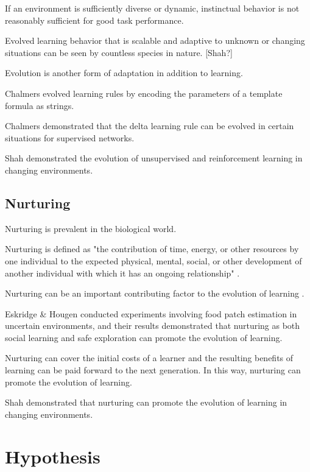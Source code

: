 \documentclass[master]{outhesis}
\begin{document}
If an environment is sufficiently diverse or dynamic, instinctual behavior is not reasonably sufficient for good task performance.

Evolved learning behavior that is scalable and adaptive to unknown or changing situations can be seen by countless species in nature. [Shah?]

Evolution is another form of adaptation in addition to learning.

Chalmers \cite{chalmers-evolution-learning} evolved learning rules by encoding the parameters of a template formula as strings.

Chalmers \cite{chalmers-evolution-learning} demonstrated that the delta learning rule can be evolved in certain situations for supervised networks.

Shah \cite{Shah:2015hs} demonstrated the evolution of unsupervised and reinforcement learning in changing environments.

\section{Nurturing}

Nurturing is prevalent in the biological world.

Nurturing is defined as "the contribution of time, energy, or other resources by one individual to the expected physical, mental, social, or other development of another individual with which it has an ongoing relationship" \cite{nurturing-definition}.

Nurturing can be an important contributing factor to the evolution of learning \cite{nurturing-definition} \cite{eskridge-learning-uncertain-environments}. 

Eskridge \& Hougen \cite{eskridge-learning-uncertain-environments} conducted experiments involving food patch estimation in uncertain environments, and their results demonstrated that nurturing as both social learning and safe exploration can promote the evolution of learning. 

Nurturing can cover the initial costs of a learner and the resulting benefits of learning can be paid forward to the next generation. In this way, nurturing can promote the evolution of learning.

Shah \cite{Shah:2015hs} demonstrated that nurturing can promote the evolution of learning in changing environments.

\chapter{Hypothesis}
\end{document}
